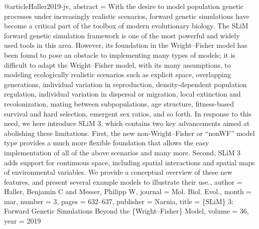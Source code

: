 @article{Haller2019-jv,
abstract = {With the desire to model population genetic processes under
increasingly realistic scenarios, forward genetic simulations
have become a critical part of the toolbox of modern
evolutionary biology. The SLiM forward genetic simulation
framework is one of the most powerful and widely used tools in
this area. However, its foundation in the Wright--Fisher model
has been found to pose an obstacle to implementing many types of
models; it is difficult to adapt the Wright--Fisher model, with
its many assumptions, to modeling ecologically realistic
scenarios such as explicit space, overlapping generations,
individual variation in reproduction, density-dependent
population regulation, individual variation in dispersal or
migration, local extinction and recolonization, mating between
subpopulations, age structure, fitness-based survival and hard
selection, emergent sex ratios, and so forth. In response to
this need, we here introduce SLiM 3, which contains two key
advancements aimed at abolishing these limitations. First, the
new non-Wright--Fisher or ``nonWF'' model type provides a much
more flexible foundation that allows the easy implementation of
all of the above scenarios and many more. Second, SLiM 3 adds
support for continuous space, including spatial interactions and
spatial maps of environmental variables. We provide a conceptual
overview of these new features, and present several example
models to illustrate their use.},
author = {Haller, Benjamin C and Messer, Philipp W},
journal = {Mol. Biol. Evol.},
month = {mar},
number = {3},
pages = {632--637},
publisher = {Narnia},
title = {{{\{}SLiM{\}} 3: Forward Genetic Simulations Beyond the {\{}Wright--Fisher{\}} Model}},
volume = {36},
year = {2019}
}
